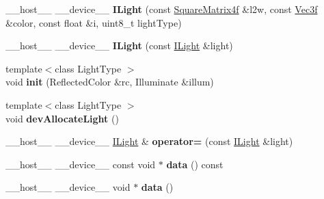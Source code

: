 \begin{DoxyCompactItemize}
\item 
\+\_\+\+\_\+host\+\_\+\+\_\+ \+\_\+\+\_\+device\+\_\+\+\_\+ {\bfseries I\+Light} (const \hyperlink{class_square_matrix4}{Square\+Matrix4f} \&l2w, const \hyperlink{class_vec3}{Vec3f} \&color, const float \&i, uint8\+\_\+t light\+Type)\hypertarget{class_i_light_a05c5ebb3f5acc921047915410d772672}{}\label{class_i_light_a05c5ebb3f5acc921047915410d772672}

\item 
\+\_\+\+\_\+host\+\_\+\+\_\+ \+\_\+\+\_\+device\+\_\+\+\_\+ {\bfseries I\+Light} (const \hyperlink{class_i_light}{I\+Light} \&light)\hypertarget{class_i_light_ae44c2228daf4c95f4df2fea3c50c8abf}{}\label{class_i_light_ae44c2228daf4c95f4df2fea3c50c8abf}

\item 
{\footnotesize template$<$class Light\+Type $>$ }\\void {\bfseries init} (Reflected\+Color \&rc, Illuminate \&illum)\hypertarget{class_i_light_a3c93b73052074a1dc80d6a18f027e8e1}{}\label{class_i_light_a3c93b73052074a1dc80d6a18f027e8e1}

\item 
{\footnotesize template$<$class Light\+Type $>$ }\\void {\bfseries dev\+Allocate\+Light} ()\hypertarget{class_i_light_a1c67d8cf9d7492c1ff61c156abaa0323}{}\label{class_i_light_a1c67d8cf9d7492c1ff61c156abaa0323}

\item 
\+\_\+\+\_\+host\+\_\+\+\_\+ \+\_\+\+\_\+device\+\_\+\+\_\+ \hyperlink{class_i_light}{I\+Light} \& {\bfseries operator=} (const \hyperlink{class_i_light}{I\+Light} \&light)\hypertarget{class_i_light_aa813302e695747a6a5280bda335e9632}{}\label{class_i_light_aa813302e695747a6a5280bda335e9632}

\item 
\+\_\+\+\_\+host\+\_\+\+\_\+ \+\_\+\+\_\+device\+\_\+\+\_\+ const void $\ast$ {\bfseries data} () const\hypertarget{class_i_light_a9c07907231ff944271f6dab6d88b1432}{}\label{class_i_light_a9c07907231ff944271f6dab6d88b1432}

\item 
\+\_\+\+\_\+host\+\_\+\+\_\+ \+\_\+\+\_\+device\+\_\+\+\_\+ void $\ast$ {\bfseries data} ()\hypertarget{class_i_light_ae49c0d8a0be349e28b9a0e0c6c2a9306}{}\label{class_i_light_ae49c0d8a0be349e28b9a0e0c6c2a9306}

\end{DoxyCompactItemize}

